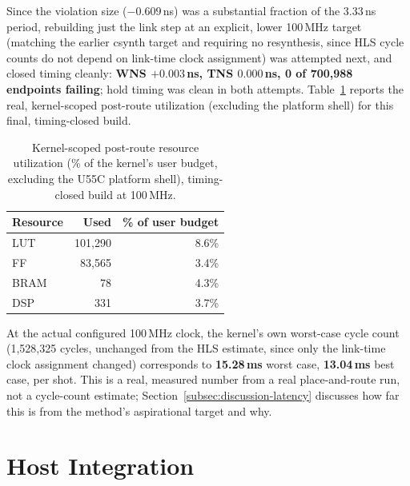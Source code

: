 \documentclass[pdflatex,sn-basic]{sn-jnl}
\begin{document}
Since the violation size (\(-0.609\)\,ns) was a substantial fraction of the 3.33\,ns period, rebuilding just the link step at an explicit, lower 100\,MHz target (matching the earlier csynth target and requiring no resynthesis, since HLS cycle counts do not depend on link-time clock assignment) was attempted next, and closed timing cleanly: \textbf{WNS \(+0.003\)\,ns, TNS \(0.000\)\,ns, 0 of 700{,}988 endpoints failing}; hold timing was clean in both attempts. Table~\ref{tab:kernel-util-routed} reports the real, kernel-scoped post-route utilization (excluding the platform shell) for this final, timing-closed build.

\begin{table}[t]
\centering
\caption{Kernel-scoped post-route resource utilization (\% of the kernel's user budget, excluding the U55C platform shell), timing-closed build at 100\,MHz.}\label{tab:kernel-util-routed}
\begin{tabular}{lrr}
\toprule
Resource & Used & \% of user budget \\
\midrule
LUT & 101{,}290 & 8.6\% \\
FF & 83{,}565 & 3.4\% \\
BRAM & 78 & 4.3\% \\
DSP & 331 & 3.7\% \\
\bottomrule
\end{tabular}
\end{table}

At the actual configured 100\,MHz clock, the kernel's own worst-case cycle count (1{,}528{,}325 cycles, unchanged from the HLS estimate, since only the link-time clock assignment changed) corresponds to \textbf{15.28\,ms} worst case, \textbf{13.04\,ms} best case, per shot. This is a real, measured number from a real place-and-route run, not a cycle-count estimate; Section~\ref{subsec:discussion-latency} discusses how far this is from the method's aspirational target and why.

\section{Host Integration}\label{sec:host-section}
\end{document}
